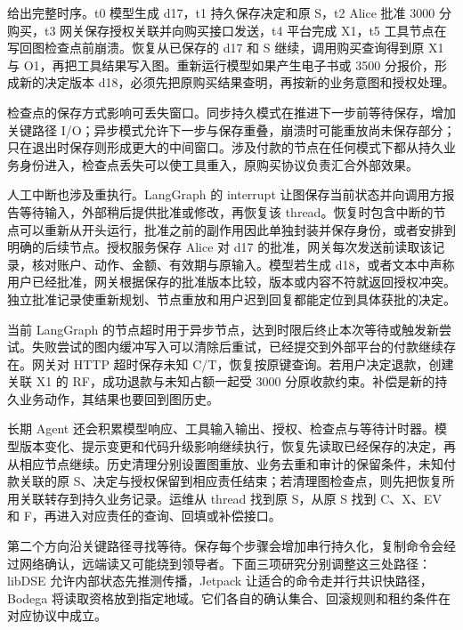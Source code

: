 
给出完整时序。t0 模型生成 d17，t1 持久保存决定和原 S，t2 Alice 批准 3000 分购买，t3 网关保存授权关联并向购买接口发送，t4 平台完成 X1，t5 工具节点在写回图检查点前崩溃。恢复从已保存的 d17 和 S 继续，调用购买查询得到原 X1 与 O1，再把工具结果写入图。重新运行模型如果产生电子书或 3500 分报价，形成新的决定版本 d18，必须先把原购买结果查明，再按新的业务意图和授权处理。


检查点的保存方式影响可丢失窗口。同步持久模式在推进下一步前等待保存，增加关键路径 I/O；异步模式允许下一步与保存重叠，崩溃时可能重放尚未保存部分；只在退出时保存则形成更大的中间窗口。涉及付款的节点在任何模式下都从持久业务身份进入，检查点丢失可以使工具重入，原购买协议负责汇合外部效果。

人工中断也涉及重执行。LangGraph 的 interrupt 让图保存当前状态并向调用方报告等待输入，外部稍后提供批准或修改，再恢复该 thread。恢复时包含中断的节点可以重新从开头运行，批准之前的副作用因此单独封装并保存身份，或者安排到明确的后续节点。授权服务保存 Alice 对 d17 的批准，网关每次发送前读取该记录，核对账户、动作、金额、有效期与原输入。模型若生成 d18，或者文本中声称用户已经批准，网关根据保存的批准版本比较，版本或内容不符就返回授权冲突。独立批准记录使重新规划、节点重放和用户迟到回复都能定位到具体获批的决定。

当前 LangGraph 的节点超时用于异步节点，达到时限后终止本次等待或触发新尝试。失败尝试的图内缓冲写入可以清除后重试，已经提交到外部平台的付款继续存在。网关对 HTTP 超时保存未知 C/T，恢复按原键查询。若用户决定退款，创建关联 X1 的 RF，成功退款与未知占额一起受 3000 分原收款约束。补偿是新的持久业务动作，其结果也要回到图历史。

长期 Agent 还会积累模型响应、工具输入输出、授权、检查点与等待计时器。模型版本变化、提示变更和代码升级影响继续执行，恢复先读取已经保存的决定，再从相应节点继续。历史清理分别设置图重放、业务去重和审计的保留条件，未知付款关联的原 S、决定与授权保留到相应责任结束；若清理图检查点，则先把恢复所用关联转存到持久业务记录。运维从 thread 找到原 S，从原 S 找到 C、X、EV 和 F，再进入对应责任的查询、回填或补偿接口。

第二个方向沿关键路径寻找等待。保存每个步骤会增加串行持久化，复制命令会经过网络确认，远端读又可能绕到领导者。下面三项研究分别调整这三处路径：libDSE 允许内部状态先推测传播，Jetpack 让适合的命令走并行共识快路径，Bodega 将读取资格放到指定地域。它们各自的确认集合、回滚规则和租约条件在对应协议中成立。

